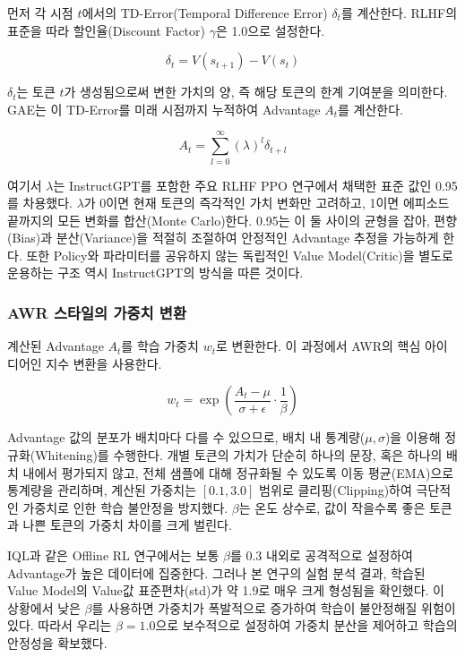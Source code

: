 \documentclass[11pt,a4paper]{article}
\begin{document}
먼저 각 시점 $t$에서의 TD-Error(Temporal Difference Error) $\delta_t$를 계산한다. RLHF의 표준을 따라 할인율(Discount Factor) $\gamma$은 1.0으로 설정한다.

\begin{equation}
\delta_t = V(s_{t+1}) - V(s_t)
\end{equation}

$\delta_t$는 토큰 $t$가 생성됨으로써 변한 가치의 양, 즉 해당 토큰의 한계 기여분을 의미한다. GAE는 이 TD-Error를 미래 시점까지 누적하여 Advantage $A_t$를 계산한다.

\begin{equation}
A_t = \sum_{l=0}^{\infty} (\lambda)^l \delta_{t+l}
\end{equation}

여기서 $\lambda$는 InstructGPT를 포함한 주요 RLHF PPO 연구에서 채택한 표준 값인 0.95를 차용했다. $\lambda$가 0이면 현재 토큰의 즉각적인 가치 변화만 고려하고, 1이면 에피소드 끝까지의 모든 변화를 합산(Monte Carlo)한다. 0.95는 이 둘 사이의 균형을 잡아, 편향(Bias)과 분산(Variance)을 적절히 조절하여 안정적인 Advantage 추정을 가능하게 한다. 또한 Policy와 파라미터를 공유하지 않는 독립적인 Value Model(Critic)을 별도로 운용하는 구조 역시 InstructGPT의 방식을 따른 것이다.

\subsubsection{AWR 스타일의 가중치 변환}
계산된 Advantage $A_t$를 학습 가중치 $w_t$로 변환한다. 이 과정에서 AWR의 핵심 아이디어인 지수 변환을 사용한다.

\begin{equation}
w_t = \exp\left(\frac{A_t - \mu}{\sigma + \epsilon} \cdot \frac{1}{\beta}\right)
\end{equation}

Advantage 값의 분포가 배치마다 다를 수 있으므로, 배치 내 통계량($\mu, \sigma$)을 이용해 정규화(Whitening)를 수행한다. 개별 토큰의 가치가 단순히 하나의 문장, 혹은 하나의 배치 내에서 평가되지 않고, 전체 샘플에 대해 정규화될 수 있도록 이동 평균(EMA)으로 통계량을 관리하며, 계산된 가중치는 $[0.1, 3.0]$ 범위로 클리핑(Clipping)하여 극단적인 가중치로 인한 학습 불안정을 방지했다. $\beta$는 온도 상수로, 값이 작을수록 좋은 토큰과 나쁜 토큰의 가중치 차이를 크게 벌린다. 

IQL과 같은 Offline RL 연구에서는 보통 $\beta$를 0.3 내외로 공격적으로 설정하여 Advantage가 높은 데이터에 집중한다. 그러나 본 연구의 실험 분석 결과, 학습된 Value Model의 Value값 표준편차(std)가 약 1.9로 매우 크게 형성됨을 확인했다. 이 상황에서 낮은 $\beta$를 사용하면 가중치가 폭발적으로 증가하여 학습이 불안정해질 위험이 있다. 따라서 우리는 $\beta=1.0$으로 보수적으로 설정하여 가중치 분산을 제어하고 학습의 안정성을 확보했다.
\end{document}
